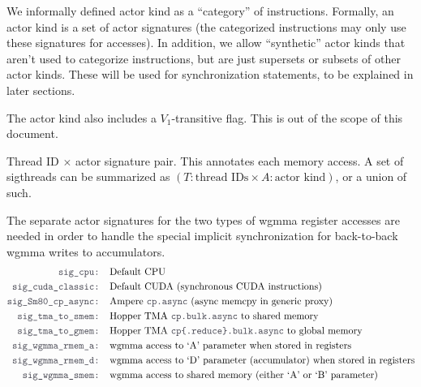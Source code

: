 \filbreak
{} We informally defined actor kind as a ``category'' of instructions.
Formally, an actor kind is a set of actor signatures (the categorized instructions may only use these signatures for accesses).
In addition, we allow ``synthetic'' actor kinds that aren't used to categorize instructions, but are just supersets or subsets of other actor kinds.
These will be used for synchronization statements, to be explained in later sections.

\filbreak
The actor kind also includes a $V_1$-transitive flag.
This is out of the scope of this document.

\filbreak
{} Thread ID $\times$ actor signature pair.
This annotates each memory access.
A set of sigthreads can be summarized as $(T:\text{thread IDs} \times A:\text{actor kind})$, or a union of such.

\filbreak
{} The separate actor signatures for the two types of wgmma register accesses are needed in order to handle the special implicit synchronization for back-to-back wgmma writes to accumulators.
\begin{align*}
\lighttt{sig\_cpu: } & \text{Default CPU}\\
\lighttt{sig\_cuda\_classic: } & \text{Default CUDA (synchronous CUDA instructions)}\\
\lighttt{sig\_Sm80\_cp\_async: } & \text{Ampere \lighttt{cp.async} (async memcpy in generic proxy)}\\
\lighttt{sig\_tma\_to\_smem: } & \text{Hopper TMA \lighttt{cp.bulk.async} to shared memory}\\
\lighttt{sig\_tma\_to\_gmem: } & \text{Hopper TMA \lighttt{cp\{.reduce\}.bulk.async} to global memory}\\
\lighttt{sig\_wgmma\_rmem\_a: } & \text{wgmma access to `A' parameter when stored in registers}\\
\lighttt{sig\_wgmma\_rmem\_d: } & \text{wgmma access to `D' parameter (accumulator) when stored in registers}\\
\lighttt{sig\_wgmma\_smem: } & \text{wgmma access to shared memory (either `A' or `B' parameter)}
\end{align*}

